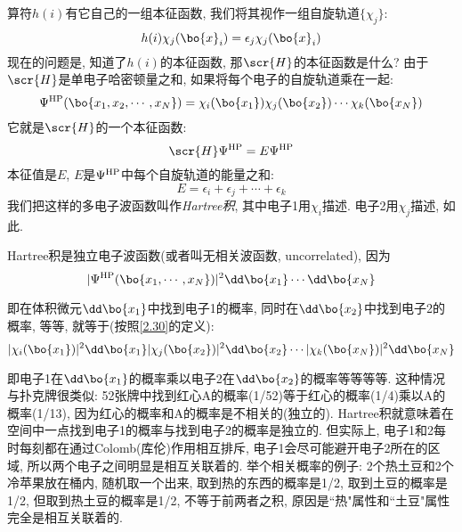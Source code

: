 算符$h(i)$有它自己的一组本征函数, 
我们将其视作一组自旋轨道$\{\chi_j\}$:
\begin{equation}
\label{2.29}
h(i)\chi_j(\bo{x}_i)=\epsilon_j\chi_j(\bo{x}_i)
\end{equation}
现在的问题是, 
知道了$h(i)$的本征函数, 
那$\scr{H}$的本征函数是什么? 由于$\scr{H}$是单电子哈密顿量之和, 
如果将每个电子的自旋轨道乘在一起:
\begin{equation}
\label{2.30}
\Psi^{\rm HP}(\bo{x_1,x_2,\cdots,x_N})=\chi_i(\bo{x_1})\chi_j(\bo{x_2})\cdots\chi_k(\bo{x_N})
\end{equation}
它就是$\scr{H}$的一个本征函数:
\begin{equation}
\label{2.31}
\scr{H}\Psi^{\rm HP}=E\Psi^{\rm HP}
\end{equation}
本征值是$E$, 
$E$是$\Psi^{\rm HP}$中每个自旋轨道的能量之和:
\begin{equation}
\label{2.32}
E=\epsilon_i + \epsilon_j + \cdots + \epsilon_k
\end{equation} 
我们把这样的多电子波函数叫作\emph{Hartree积}, 
其中电子1用$\chi_i$描述. 
电子2用$\chi_j$描述, 
如此.



Hartree积是独立电子波函数(或者叫无相关波函数, uncorrelated), 因为
\begin{equation*}
|\Psi^{\rm HP}(\bo{x_1,\cdots,x_N})|^2\dd\bo{x_1}\cdots\dd\bo{x_N}
\end{equation*}

即在体积微元$\dd\bo{x_1}$中找到电子1的概率, 
同时在$\dd\bo{x_2}$中找到电子2的概率, 
等等, 
就等于(按照\autoref{2.30}的定义):
\begin{equation*}
|\chi_i(\bo{x_1})|^2\dd\bo{x_1}|\chi_j(\bo{x_2})|^2\dd\bo{x_2}\cdots|\chi_k(\bo{x_N})|^2\dd\bo{x_N}
\end{equation*}

即电子1在$\dd\bo{x_1}$的概率乘以电子2在$\dd\bo{x_2}$的概率等等等等. 
这种情况与扑克牌很类似: 52张牌中找到红心A的概率(1/52)等于红心的概率(1/4)乘以A的概率(1/13), 
因为红心的概率和A的概率是不相关的(独立的). 
Hartree积就意味着在空间中一点找到电子1的概率与找到电子2的概率是独立的. 
但实际上, 
电子1和2每时每刻都在通过Colomb(库伦)作用相互排斥, 
电子1会尽可能避开电子2所在的区域, 
所以两个电子之间明显是相互关联着的. 
举个相关概率的例子: 2个热土豆和2个冷苹果放在桶内, 
随机取一个出来, 
取到热的东西的概率是1/2, 
取到土豆的概率是1/2, 
但取到热土豆的概率是1/2, 
不等于前两者之积, 
原因是``热"属性和``土豆"属性完全是相互关联着的.


